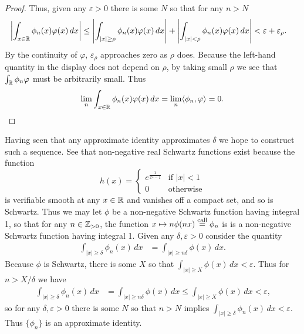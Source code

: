 \begin{proof}
      Thus, given any $\varepsilon>0$ there is some $N$ so that for any $n>N$
      \begin{align*}
        \left| \int_{x\in\mathbb{R}} \phi_n(x)\varphi(x)\,dx \right|
        &\le \left| \int_{|x|\ge\rho} \phi_n(x)\varphi(x)\,dx \right|
        + \left| \int_{|x|<\rho} \phi_n(x)\varphi(x)\,dx\right|
        < \varepsilon + \varepsilon_\rho \text{.}
      \end{align*}
      By the continuity of $\varphi$, $\varepsilon_\rho$ approaches zero as $\rho$ does.
      Because the left-hand quantity in the display does not depend on $\rho$, by taking small $\rho$ we see that $\int_\mathbb{R} \phi_n\varphi$ must be arbitrarily small.
      Thus
      \begin{align*}
        \lim_n \int_{x\in\mathbb{R}} \phi_n(x)\varphi(x)\,dx = \lim_n\langle\phi_n,\varphi\rangle=0 \text{.}
      \end{align*}
    \end{proof}

    Having seen that any approximate identity approximates $\delta$ we hope to construct such a sequence.
    See that non-negative real Schwartz functions exist because the function
    \begin{equation*}
      \label{eq:extestfcn}
      h(x) =
      \begin{cases}
        e^\frac{1}{x^2-1} &\text{if }|x|<1\\
        0 &\text{otherwise}
      \end{cases}
    \end{equation*}
    is verifiable smooth at any $x\in\mathbb{R}$ and vanishes off a compact set, and so is Schwartz.
    Thus we may let $\phi$ be a non-negative Schwartz function having integral 1, so that for any $n\in\mathbb{Z}_{>0}$, the function $x\mapsto n\phi(nx) \overset{\text{call}}{=} \phi_n$ is is a non-negative Schwartz function having integral 1.
    Given any $\delta,\varepsilon>0$ consider the quantity
    \begin{align*}
      \int_{|x|\ge\delta} \phi_n(x) \,dx
      &= \int_{|x|\ge n\delta} \phi(x) \,dx \text{.}
    \end{align*}
    Because $\phi$ is Schwartz, there is some $X$ so that $\int_{|x|\ge X}\phi(x)\,dx<\varepsilon$.
    Thus for $n>X/\delta$ we have 
    \begin{align*}
      \int_{|x|\ge\delta} \phi_n(x) \,dx
      &= \int_{|x|\ge n\delta} \phi(x) \,dx
      \le \int_{|x|\ge X} \phi(x) \,dx
      <\varepsilon \text{,}
    \end{align*}
    so for any $\delta,\varepsilon>0$ there is some $N$ so that $n>N$ implies $\int_{|x|\ge\delta}\phi_n(x)\,dx<\varepsilon$.
    Thus $\{\phi_n\}$ is an approximate identity.

